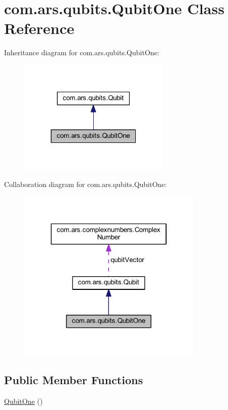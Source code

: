 \hypertarget{classcom_1_1ars_1_1qubits_1_1_qubit_one}{}\section{com.\+ars.\+qubits.\+Qubit\+One Class Reference}
\label{classcom_1_1ars_1_1qubits_1_1_qubit_one}


Inheritance diagram for com.\+ars.\+qubits.\+Qubit\+One\+:\nopagebreak
\begin{figure}[H]
\begin{center}
\leavevmode
\includegraphics[width=205pt]{classcom_1_1ars_1_1qubits_1_1_qubit_one__inherit__graph}
\end{center}
\end{figure}


Collaboration diagram for com.\+ars.\+qubits.\+Qubit\+One\+:\nopagebreak
\begin{figure}[H]
\begin{center}
\leavevmode
\includegraphics[width=250pt]{classcom_1_1ars_1_1qubits_1_1_qubit_one__coll__graph}
\end{center}
\end{figure}
\subsection*{Public Member Functions}
\begin{DoxyCompactItemize}
\item 
\hyperlink{classcom_1_1ars_1_1qubits_1_1_qubit_one_a22be10817ff693defa00a6bc293cf322}{Qubit\+One} ()
\end{DoxyCompactItemize}

